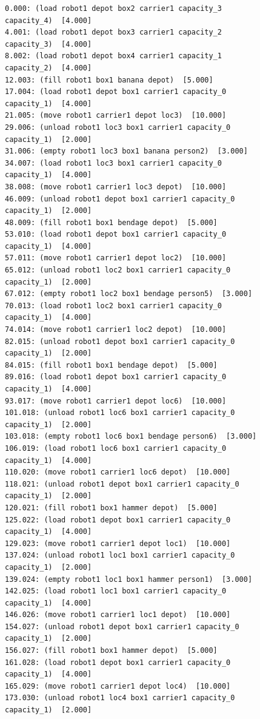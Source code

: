 \begin{figure}[h!]
    \small
    \begin{verbatim}
0.000: (load robot1 depot box2 carrier1 capacity_3 capacity_4)  [4.000]
4.001: (load robot1 depot box3 carrier1 capacity_2 capacity_3)  [4.000]
8.002: (load robot1 depot box4 carrier1 capacity_1 capacity_2)  [4.000]
12.003: (fill robot1 box1 banana depot)  [5.000]
17.004: (load robot1 depot box1 carrier1 capacity_0 capacity_1)  [4.000]
21.005: (move robot1 carrier1 depot loc3)  [10.000]
29.006: (unload robot1 loc3 box1 carrier1 capacity_0 capacity_1)  [2.000]
31.006: (empty robot1 loc3 box1 banana person2)  [3.000]
34.007: (load robot1 loc3 box1 carrier1 capacity_0 capacity_1)  [4.000]
38.008: (move robot1 carrier1 loc3 depot)  [10.000]
46.009: (unload robot1 depot box1 carrier1 capacity_0 capacity_1)  [2.000]
48.009: (fill robot1 box1 bendage depot)  [5.000]
53.010: (load robot1 depot box1 carrier1 capacity_0 capacity_1)  [4.000]
57.011: (move robot1 carrier1 depot loc2)  [10.000]
65.012: (unload robot1 loc2 box1 carrier1 capacity_0 capacity_1)  [2.000]
67.012: (empty robot1 loc2 box1 bendage person5)  [3.000]
70.013: (load robot1 loc2 box1 carrier1 capacity_0 capacity_1)  [4.000]
74.014: (move robot1 carrier1 loc2 depot)  [10.000]
82.015: (unload robot1 depot box1 carrier1 capacity_0 capacity_1)  [2.000]
84.015: (fill robot1 box1 bendage depot)  [5.000]
89.016: (load robot1 depot box1 carrier1 capacity_0 capacity_1)  [4.000]
93.017: (move robot1 carrier1 depot loc6)  [10.000]
101.018: (unload robot1 loc6 box1 carrier1 capacity_0 capacity_1)  [2.000]
103.018: (empty robot1 loc6 box1 bendage person6)  [3.000]
106.019: (load robot1 loc6 box1 carrier1 capacity_0 capacity_1)  [4.000]
110.020: (move robot1 carrier1 loc6 depot)  [10.000]
118.021: (unload robot1 depot box1 carrier1 capacity_0 capacity_1)  [2.000]
120.021: (fill robot1 box1 hammer depot)  [5.000]
125.022: (load robot1 depot box1 carrier1 capacity_0 capacity_1)  [4.000]
129.023: (move robot1 carrier1 depot loc1)  [10.000]
137.024: (unload robot1 loc1 box1 carrier1 capacity_0 capacity_1)  [2.000]
139.024: (empty robot1 loc1 box1 hammer person1)  [3.000]
142.025: (load robot1 loc1 box1 carrier1 capacity_0 capacity_1)  [4.000]
146.026: (move robot1 carrier1 loc1 depot)  [10.000]
154.027: (unload robot1 depot box1 carrier1 capacity_0 capacity_1)  [2.000]
156.027: (fill robot1 box1 hammer depot)  [5.000]
161.028: (load robot1 depot box1 carrier1 capacity_0 capacity_1)  [4.000]
165.029: (move robot1 carrier1 depot loc4)  [10.000]
173.030: (unload robot1 loc4 box1 carrier1 capacity_0 capacity_1)  [2.000]

\end{verbatim}
\end{figure}
